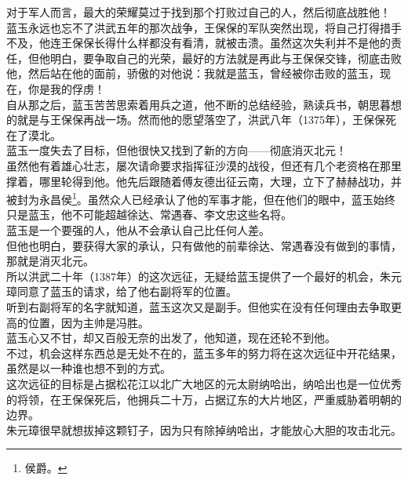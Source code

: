 \begin{multicols}{\theparacolNo}
对于军人而言，最大的荣耀莫过于找到那个打败过自己的人，然后彻底战胜他！\\

蓝玉永远也忘不了洪武五年的那次战争，王保保的军队突然出现，将自己打得措手不及，他连王保保长得什么样都没有看清，就被击溃。虽然这次失利并不是他的责任，但他明白，要争取自己的光荣，最好的方法就是再此与王保保交锋，彻底击败他，然后站在他的面前，骄傲的对他说：我就是蓝玉，曾经被你击败的蓝玉，现在，你是我的俘虏！\\

自从那之后，蓝玉苦苦思索着用兵之道，他不断的总结经验，熟读兵书，朝思暮想的就是与王保保再战一场。然而他的愿望落空了，洪武八年（1375年），王保保死在了漠北。\\

蓝玉一度失去了目标，但他很快又找到了新的方向——彻底消灭北元！\\

虽然他有着雄心壮志，屡次请命要求指挥征沙漠的战役，但还有几个老资格在那里撑着，哪里轮得到他。他先后跟随着傅友德出征云南，大理，立下了赫赫战功，并被封为永昌侯\footnote{侯爵。}。虽然众人已经承认了他的军事才能，但在他们的眼中，蓝玉始终只是蓝玉，他不可能超越徐达、常遇春、李文忠这些名将。\\

蓝玉是一个要强的人，他从不会承认自己比任何人差。\\

但他也明白，要获得大家的承认，只有做他的前辈徐达、常遇春没有做到的事情，那就是消灭北元。\\

所以洪武二十年（1387年）的这次远征，无疑给蓝玉提供了一个最好的机会，朱元璋同意了蓝玉的请求，给了他右副将军的位置。\\

听到右副将军的名字就知道，蓝玉这次又是副手。但他实在没有任何理由去争取更高的位置，因为主帅是冯胜。\\

蓝玉心又不甘，却又百般无奈的出发了，他知道，现在还轮不到他。\\

不过，机会这样东西总是无处不在的，蓝玉多年的努力将在这次远征中开花结果，虽然是以一种谁也想不到的方式。\\

这次远征的目标是占据松花江以北广大地区的元太尉纳哈出，纳哈出也是一位优秀的将领，在王保保死后，他拥兵二十万，占据辽东的大片地区，严重威胁着明朝的边界。\\

朱元璋很早就想拔掉这颗钉子，因为只有除掉纳哈出，才能放心大胆的攻击北元。\\


\end{multicols}
